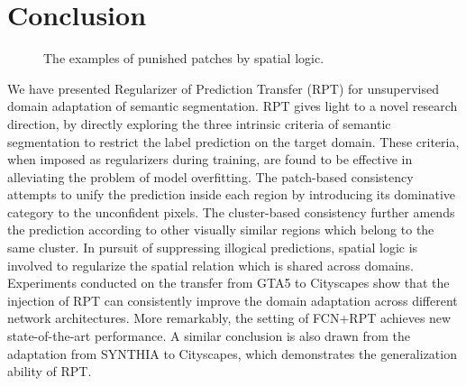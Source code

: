 \documentclass[10pt,twocolumn,letterpaper]{article}
\begin{document}
\section{Conclusion}
\begin{figure}[!tb]
   \caption{\small The examples of punished patches by spatial logic.}
   \label{fig:case_loss_logic}
   \vspace{-0.15in}
\end{figure}
We have presented Regularizer of Prediction Transfer (RPT) for unsupervised domain adaptation of semantic segmentation. RPT gives light to a novel research direction, by directly exploring the three intrinsic criteria of semantic segmentation to restrict the label prediction on the target domain. These criteria, when imposed as regularizers during training, are found to be effective in alleviating the problem of model overfitting.
The patch-based consistency attempts to unify the prediction inside each region by introducing its dominative category to the unconfident pixels. The cluster-based consistency further amends the prediction according to other visually similar regions which belong to the same cluster. In pursuit of suppressing illogical predictions, spatial logic is involved to regularize the spatial relation which is shared across domains.
Experiments conducted on the transfer from GTA5 to Cityscapes show that the injection of RPT can consistently improve the domain adaptation across different network architectures. More remarkably, the setting of FCN+RPT achieves new state-of-the-art performance. A similar conclusion is also drawn from the adaptation from SYNTHIA to Cityscapes, which demonstrates the generalization ability of RPT.


{\small


}
\end{document}
